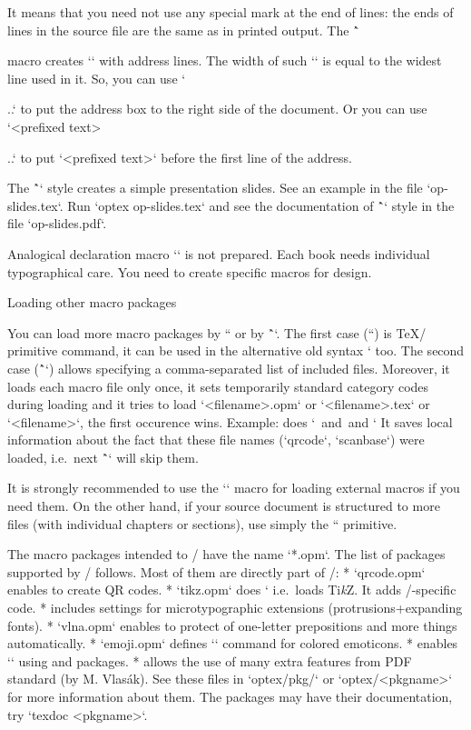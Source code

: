 {It means that you need not use any special mark at the end of lines: the ends
of lines in the source file are the same as in printed output. The
\^`\address` macro creates `\vtop` with address lines. The width of such
`\vtop` is equal to the widest line used in it. So, you can use
`\hfill\address...` to put the address box to the right side of the
document. Or you can use `<prefixed text>\address...` to put
`<prefixed text>` before the first line of the address.

The \^`\slides` style creates a simple presentation slides. See an example
in the file `op-slides.tex`. Run `optex op-slides.tex` and see the documentation of
\^`\slides` style in the file `op-slides.pdf`.

Analogical declaration macro `\book` is not prepared. Each book needs
individual typographical care. You need to create specific macros for
design.

\secc Loading other macro packages

You can load more macro packages by `` or by
\^``. The first case (``) is \TeX/ primitive command, it can be
used in the alternative old syntax ` too. The
second case (\^`\load`) allows specifying a comma-separated list of included files.
Moreover, it loads each macro file only once, it sets
temporarily standard category codes during loading and it tries to
load `<filename>.opm` or `<filename>.tex` or `<filename>`, the first occurence
wins. Example:
\begtt
{}
\endtt
%
does ` \,and \,and `
It saves local information about the fact that these file names
(`qrcode`, `scanbase`) were loaded, i.e.\ next \^`\load` will skip them.

It is strongly recommended to use the `\load` macro for loading external
macros if you need them. On the other hand, if your source document is structured
to more files (with individual chapters or sections), use simply the `` primitive.

The macro packages intended to \OpTeX/ have the name `*.opm`.
The list of packages supported by \OpTeX/ follows. Most of them are directly part of \OpTeX/:
\begitems
* `qrcode.opm` enables to create QR codes.
* `tikz.opm` does ` i.e.\ loads Ti{\it k\/}Z. It adds \OpTeX/-specific code.
* 
  includes settings for microtypographic extensions (protrusions+expanding fonts).
* `vlna.opm` enables to protect of one-letter prepositions and more things automatically.
* `emoji.opm` defines `` command for colored emoticons.
*  enables
  `\directmetapost` using 
  and  packages.
* 
  allows the use of many extra features from PDF standard (by M. Vlasák).
\enditems
See these files in `optex/pkg/` or `optex/<pkgname>` for more information about
them. The packages may have their documentation, try `texdoc <pkgname>`.

}
